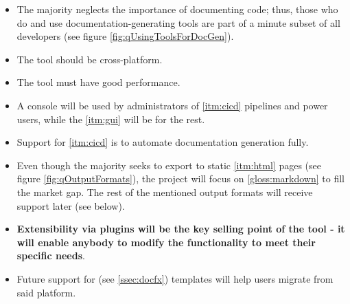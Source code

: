 \begin{itemize}
    \item The majority neglects the importance of documenting code; thus, those who do and use documentation-generating tools are part of a minute subset of all developers (see figure \ref{fig:qUsingToolsForDocGen}).
    \item The tool should be cross-platform.
    \item The tool must have good performance.
    \item A console will be used by administrators of \ref{itm:cicd} pipelines and power users, while the \ref{itm:gui} will be for the rest.
    \item Support for \ref{itm:cicd} is to automate documentation generation fully.
    \item Even though the majority seeks to export to static \ref{itm:html} pages (see figure \ref{fig:qOutputFormats}), the project will focus on \ref{gloss:markdown} to fill  the market gap. The rest of the mentioned output formats will receive support later (see below).
    \item \textbf{Extensibility via plugins will be the key selling point of the tool - it will enable anybody to modify the functionality to meet their specific needs}.
    \item Future support for  (see \ref{ssec:docfx}) templates will help users migrate from said platform.
\end{itemize}